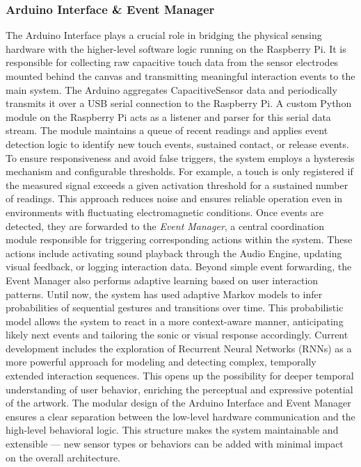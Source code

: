\documentclass{article}
\begin{document}
\subsubsection{Arduino Interface \& Event Manager}
The Arduino Interface plays a crucial role in bridging the physical sensing hardware with the higher-level software logic running on the Raspberry Pi. It is responsible for collecting raw capacitive touch data from the sensor electrodes mounted behind the canvas and transmitting meaningful interaction events to the main system. \newline 
The Arduino aggregates CapacitiveSensor data and periodically transmits it over a USB serial connection to the Raspberry Pi. A custom Python module on the Raspberry Pi acts as a listener and parser for this serial data stream. The module maintains a queue of recent readings and applies event detection logic to identify new touch events, sustained contact, or release events. \newline 
To ensure responsiveness and avoid false triggers, the system employs a hysteresis mechanism and configurable thresholds. For example, a touch is only registered if the measured signal exceeds a given activation threshold for a sustained number of readings. This approach reduces noise and ensures reliable operation even in environments with fluctuating electromagnetic conditions. \newline 
Once events are detected, they are forwarded to the \textit{Event Manager}, a central coordination module responsible for triggering corresponding actions within the system. These actions include activating sound playback through the Audio Engine, updating visual feedback, or logging interaction data. \newline 
Beyond simple event forwarding, the Event Manager also performs adaptive learning based on user interaction patterns. Until now, the system has used adaptive Markov models to infer probabilities of sequential gestures and transitions over time. This probabilistic model allows the system to react in a more context-aware manner, anticipating likely next events and tailoring the sonic or visual response accordingly. \newline 
Current development includes the exploration of Recurrent Neural Networks (RNNs) as a more powerful approach for modeling and detecting complex, temporally extended interaction sequences. This opens up the possibility for deeper temporal understanding of user behavior, enriching the perceptual and expressive potential of the artwork. \newline 
The modular design of the Arduino Interface and Event Manager ensures a clear separation between the low-level hardware communication and the high-level behavioral logic. This structure makes the system maintainable and extensible — new sensor types or behaviors can be added with minimal impact on the overall architecture.
\end{document}
